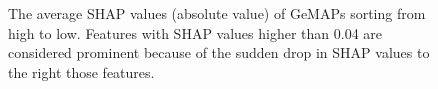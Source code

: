 \begin{figure}[th]
	\centering
	\caption{The average SHAP values (absolute value) of GeMAPs sorting from high to low. Features with SHAP values higher than 0.04 are considered prominent because of the 
sudden drop in SHAP values to the right those features. 
}%
	\label{fig:prominentfig} %
\end{figure}



